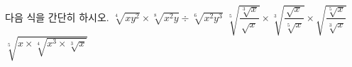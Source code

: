 다음 식을 간단히 하시오. 
 $\sqrt[4]{xy^2}\times\sqrt[8]{x^2y}\div\sqrt[6]{x^2y^3}$
 $\sqrt[5]{\dfrac{\sqrt[3]{x}}{\sqrt{x}}}\times\sqrt[3]{\dfrac{\sqrt{x}}{\sqrt[5]{x}}}\times\sqrt{\dfrac{\sqrt[5]{x}}{\sqrt[3]{x}}}$
 $\sqrt[5]{x\times\sqrt[4]{x^3\times\sqrt[3]{x}}}$
